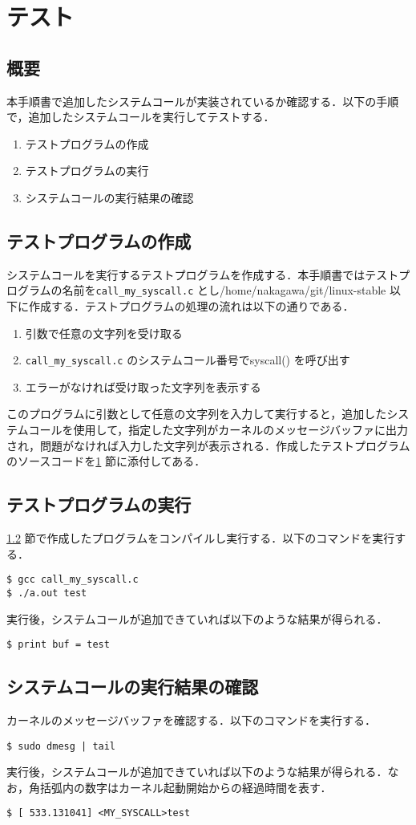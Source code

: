 \documentclass[12pt]{jsarticle}
\begin{document}
\section{テスト}\label{sec:test}
 \subsection{概要}
 本手順書で追加したシステムコールが実装されているか確認する．以下の手順で，追加したシステムコールを実行してテストする．
\begin{enumerate}
 \item テストプログラムの作成
 \item テストプログラムの実行
 \item システムコールの実行結果の確認
\end{enumerate}
\subsection{テストプログラムの作成}\label{sec:test_sakusei}
システムコールを実行するテストプログラムを作成する．本手順書ではテストプログラムの名前を\verb|call_my_syscall.c| とし/home/nakagawa/git/linux-stable 以下に作成する．テストプログラムの処理の流れは以下の通りである．
\begin{enumerate}
 \item 引数で任意の文字列を受け取る
 \item \verb|call_my_syscall.c| のシステムコール番号でsyscall() を呼び出す
 \item エラーがなければ受け取った文字列を表示する
\end{enumerate}
このプログラムに引数として任意の文字列を入力して実行すると，追加したシステムコールを使用して，指定した文字列がカーネルのメッセージバッファに出力され，問題がなければ入力した文字列が表示される．作成したテストプログラムのソースコードを\ref{sec:test} 節に添付してある．
\subsection{テストプログラムの実行}
\ref{sec:test_sakusei} 節で作成したプログラムをコンパイルし実行する．以下のコマンドを実行する．
\begin{verbatim}
$ gcc call_my_syscall.c
$ ./a.out test
\end{verbatim}
実行後，システムコールが追加できていれば以下のような結果が得られる．
\begin{verbatim}
$ print buf = test
\end{verbatim}
\subsection{システムコールの実行結果の確認}
カーネルのメッセージバッファを確認する．以下のコマンドを実行する．
\begin{verbatim}
$ sudo dmesg | tail
\end{verbatim}
実行後，システムコールが追加できていれば以下のような結果が得られる．なお，角括弧内の数字はカーネル起動開始からの経過時間を表す．
\begin{verbatim}
$ [ 533.131041] <MY_SYSCALL>test
\end{verbatim}
\end{document}
